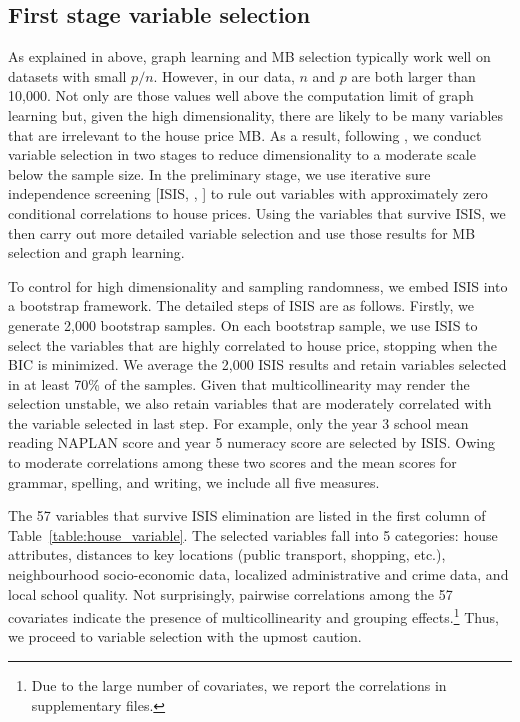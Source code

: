 \documentclass[11pt,review,authoryear]{elsarticle}
\begin{document}
\subsection{First stage variable selection}

As explained in above, graph learning and MB selection typically work well on datasets with small $p/n$. However, in our data, $n$ and $p$ are both larger than 10,000. Not only are those values well above the computation limit of graph learning but, given the high dimensionality, there are likely to be many variables that are irrelevant to the house price MB. As a result, following \citet{fan2008sure}, we conduct variable selection in two stages to reduce dimensionality to a moderate scale below the sample size. In the preliminary stage, we use iterative sure independence screening [ISIS, , \citet{fan2008sure}] to rule out variables with approximately zero conditional correlations to house prices. Using the variables that survive ISIS, we then carry out more detailed variable selection and use those results for MB selection and graph learning.

To control for high dimensionality and sampling randomness, we embed ISIS into a bootstrap framework. The detailed steps of ISIS are as follows. Firstly, we generate 2,000 bootstrap samples. On each bootstrap sample, we use ISIS to select the variables that are highly correlated to house price, stopping when the BIC is minimized. We average the 2,000 ISIS results and retain variables selected in at least 70\% of the samples. Given that multicollinearity may render the selection unstable, we also retain variables that are moderately correlated with the variable selected in last step. For example, only the year 3 school mean reading NAPLAN score and year 5 numeracy score are selected by ISIS. Owing to moderate correlations among these two scores and the mean scores for grammar, spelling, and writing, we include all five measures.

The 57 variables that survive ISIS elimination are listed in the first column of Table~\ref{table:house_variable}. The selected variables fall into 5 categories: house attributes, distances to key locations (public transport, shopping, etc.), neighbourhood socio-economic data, localized administrative and crime data, and local school quality. Not surprisingly, pairwise correlations among the 57 covariates indicate the presence of multicollinearity and grouping effects.\footnote{Due to the large number of covariates, we report the correlations in supplementary files.} Thus, we proceed to variable selection with the upmost caution.
\end{document}

